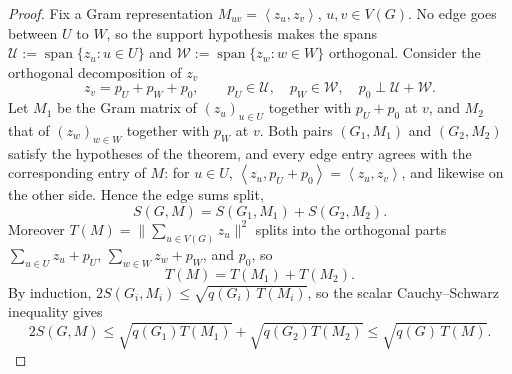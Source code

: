 \documentclass[11pt,letterpaper,reqno]{amsart}
\theoremstyle{definition}
\newcommand{\ip}[2]{\left\langle #1,#2\right\rangle}
\begin{document}
\begin{proof}
Fix a Gram representation $M_{uv}=\ip{z_u}{z_v}$, $u,v\in V(G)$.  No
edge goes between $U$ to $W$, so the support hypothesis makes the spans
$\mathcal U:=\operatorname{span}\{z_u:u\in U\}$ and
$\mathcal W:=\operatorname{span}\{z_w:w\in W\}$ orthogonal.  Consider the orthogonal decomposition of $z_v$
\[
    z_v=p_U+p_W+p_0,
    \qquad
    p_U\in\mathcal U,\quad
    p_W\in\mathcal W,\quad
    p_0\perp\mathcal U+\mathcal W.
\]
Let $M_1$ be the Gram matrix of $(z_u)_{u\in U}$ together with $p_U+p_0$
at $v$, and $M_2$ that of $(z_w)_{w\in W}$ together with $p_W$ at $v$.
Both pairs $(G_1,M_1)$ and $(G_2,M_2)$ satisfy the hypotheses of the
theorem, and every edge entry agrees with the corresponding entry of
$M$: for $u\in U$, $\ip{z_u}{p_U+p_0}=\ip{z_u}{z_v}$, and likewise on
the other side.  Hence the edge sums split,
\[
    S(G,M)=S(G_1,M_1)+S(G_2,M_2).
\]
Moreover $T(M)=\bigl\lVert\sum_{u\in V(G)}z_u\bigr\rVert^2$ splits into
the orthogonal parts $\sum_{u\in U}z_u+p_U$, $\sum_{w\in W}z_w+p_W$,
and $p_0$, so
\[
    T(M)=T(M_1)+T(M_2).
\]
By induction, $2S(G_i,M_i)\le\sqrt{q(G_i)\,T(M_i)}$, so the scalar
Cauchy--Schwarz inequality gives
\[
    2S(G,M)\le\sqrt{q(G_1)T(M_1)}+\sqrt{q(G_2)T(M_2)}
    \le\sqrt{q(G)\,T(M)}.
\]


\end{proof}
\end{document}
